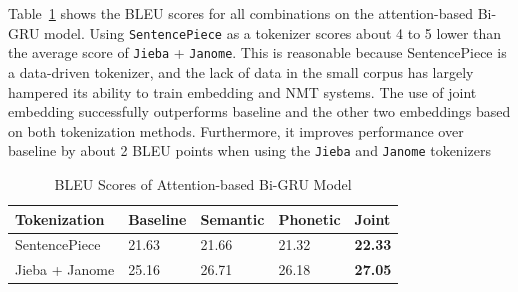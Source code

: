 Table~\ref{tab:seq2seq_bleu_score} shows the BLEU scores for all combinations on the attention-based Bi-GRU model. Using \texttt{SentencePiece} as a tokenizer scores about 4 to 5 lower than the average score of \texttt{Jieba} + \texttt{Janome}. This is reasonable because SentencePiece is a data-driven tokenizer, and the lack of data in the small corpus has largely hampered its ability to train embedding and NMT systems. The use of joint embedding successfully outperforms baseline and the other two embeddings based on both tokenization methods. Furthermore, it improves performance over baseline by about 2 BLEU points when using the \texttt{Jieba} and \texttt{Janome} tokenizers

\begin{table}[t]
    \centering
    \begin{tabularx}{\textwidth}{bbbbb}\toprule
        Tokenization & Baseline & Semantic & Phonetic & Joint \\\midrule
        SentencePiece & 21.63 & 21.66 & 21.32 & \textbf{22.33} \\
        Jieba + Janome & 25.16 & 26.71 & 26.18 & \textbf{27.05} \\\bottomrule
    \end{tabularx}
    \caption{BLEU Scores of Attention-based Bi-GRU Model}
    \label{tab:seq2seq_bleu_score}
\end{table}

